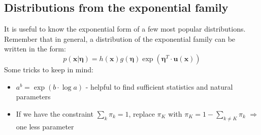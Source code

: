 \subsection{Distributions from the exponential family}
It is useful to know the exponential form of a few most popular distributions. Remember that in general, a distribution of the exponential family can be written in the form:
$$p(\bm{x}|\bm{\eta}) = h(\bm{x})g(\bm{\eta})\exp\left(\bm{\eta}^T \cdot \bm{u}(\bm{x})\right)$$
Some tricks to keep in mind:
\begin{itemize}
	\item $a^{b}=\exp(b\cdot \log a)$ - helpful to find sufficient statistics and natural parameters
	\item If we have the constraint $\sum_k \pi_k= 1$, replace $\pi_K$ with $\pi_K=1-\sum_{k\neq K} \pi_k$ $\Rightarrow$ one less parameter
\end{itemize}
